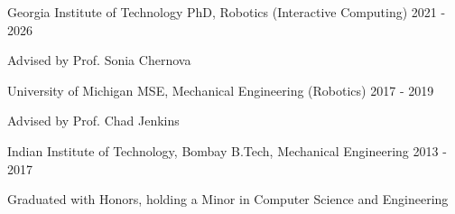 

\begin{cventries}
\cventryeducation
    {Georgia Institute of Technology}
    {PhD, Robotics (Interactive Computing)}
    {}
    {2021 - 2026}
    {
    \begin{cvitems}
    \item Advised by Prof. Sonia Chernova
    \end{cvitems}
    }

%
\cventryeducation
    {University of Michigan}
    {MSE, Mechanical Engineering (Robotics)}
    {}
    {2017 - 2019}
    {
    \begin{cvitems}
    \item Advised by Prof. Chad Jenkins
    \end{cvitems}
    }

\cventryeducation
    {Indian Institute of Technology, Bombay}
    {B.Tech, Mechanical Engineering }
    {}
    {2013 - 2017}
    {
    \begin{cvitems}
    \item Graduated with Honors, holding a Minor in Computer Science and Engineering
    \end{cvitems}
    }

\end{cventries}

